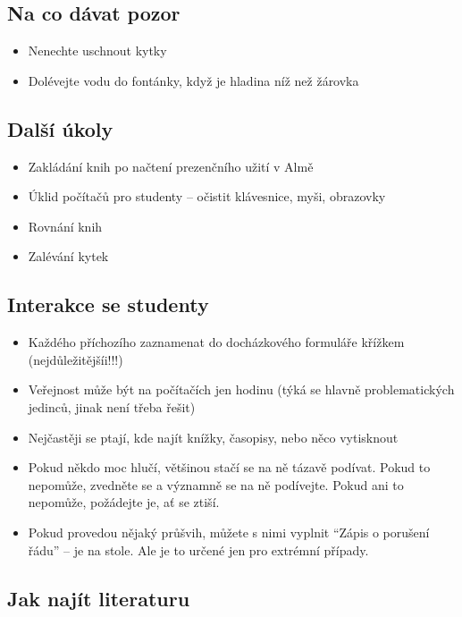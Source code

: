 \documentclass{article}
\begin{document}
\subsection{Na co dávat pozor}

\begin{itemize}
\item  Nenechte uschnout kytky
\item  Dolévejte vodu do fontánky, když je hladina níž než žárovka
\end{itemize}

\subsection{Další úkoly}

\begin{itemize}
\item Zakládání knih po načtení prezenčního užití v Almě
\item Úklid počítačů pro studenty -- očistit klávesnice, myši, obrazovky
\item Rovnání knih
\item  Zalévání kytek
\end{itemize}

\subsection{Interakce se studenty}

\begin{itemize}
\item Každého příchozího zaznamenat do docházkového formuláře křížkem (nejdůležitějšíi!!!)
\item Veřejnost může být na počítačích jen hodinu (týká se hlavně problematických jedinců, jinak není třeba řešit)
\item Nejčastěji se ptají, kde najít knížky, časopisy, nebo něco vytisknout
\item Pokud někdo moc hlučí, většinou stačí se na ně tázavě podívat. Pokud to nepomůže,
zvedněte se a významně se na ně podívejte. Pokud ani to nepomůže, požádejte je, ať se ztiší.
\item Pokud provedou nějaký průšvih, můžete s nimi vyplnit \enquote{Zápis o porušení řádu} -- je na stole. Ale je to určené jen pro extrémní případy. 
\end{itemize}
  

\subsection{Jak najít literaturu}
\end{document}

